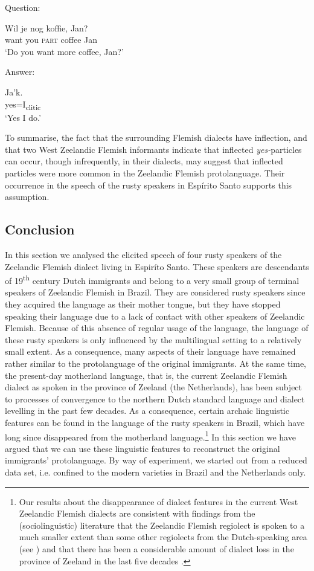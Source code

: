 \documentclass[output=paper,hidelinks,draftmode]{langscibook}
\begin{document}
\ea%
    \label{ex:schaffel:24a}

\ea Question:

\gll Wil je nog koffie, Jan?\\
want you \textsc{part} coffee Jan\\
\glt ‘Do you want more coffee, Jan?’

\ex Answer:

\gll Ja’k.\\
yes=I\textsubscript{clitic}\\
\glt ‘Yes I do.’ 

\z 
\z 

To summarise, the fact that the surrounding Flemish dialects have inflection, and that two West Zeelandic Flemish informants indicate that inflected \textit{yes-}par\-tic\-les can occur, though infrequently, in their dialects, may suggest that inflected particles were more common in the Zeelandic Flemish protolanguage. Their occurrence in the speech of the rusty speakers in Espírito Santo supports this assumption.

\subsection{Conclusion}

In this section we analysed the elicited speech of four rusty speakers of the Zeelandic Flemish dialect living in Espiríto Santo. These speakers are descendants of 19\textsuperscript{th} century Dutch immigrants and belong to a very small group of terminal speakers of Zeelandic Flemish in Brazil. They are considered rusty speakers since they acquired the language as their mother tongue, but they have stopped speaking their language due to a lack of contact with other speakers of Zeelandic Flemish. Because of this absence of regular usage of the language, the language of these rusty speakers is only influenced by the multilingual setting to a relatively small extent. As a consequence, many aspects of their language have remained rather similar to the protolanguage of the original immigrants. At the same time, the present-day motherland language, that is, the current Zeelandic Flemish dialect as spoken in the province of Zeeland (the Netherlands), has been subject to processes of convergence to the northern Dutch standard language and dialect levelling in the past few decades. As a consequence, certain archaic linguistic features can be found in the language of the rusty speakers in Brazil, which have long since disappeared from the motherland language.\footnote{ {Our results about the disappearance of dialect features in the current West Zeelandic Flemish dialects are consistent with findings from the (sociolinguistic) literature that the Zeelandic Flemish regiolect is spoken to a much smaller extent than some other regiolects from the Dutch-speaking area (see \citealt[26]{rys2019onderzoeksrapport}) and that there has been a considerable amount of dialect loss in the province of Zeeland in the last five decades \citep[11]{Versloot2021}.} } In this section we have argued that we can use these linguistic features to reconstruct the original immigrants’ protolanguage. By way of experiment, we started out from a reduced data set, i.e. confined to the modern varieties in Brazil and the Netherlands only.
\end{document}
